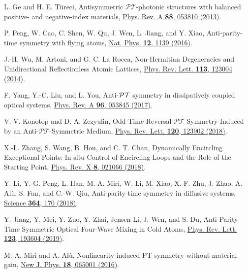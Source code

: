 \documentclass[twocolumn,prl,floatfix,citeautoscript,nofootinbib,superscriptaddress]{revtex4}
\begin{document}
\begin{thebibliography}{99}

 L. Ge and H. E. T\"ureci, Antisymmetric $%
\mathcal{PT}$-photonic structures with balanced positive- and negative-index
materials, \href{https://doi.org/10.1103/PhysRevA.88.053810}{Phys. Rev. A
\textbf{88}, 053810 (2013)}.

 P. Peng, W. Cao, C. Shen, W. Qu, J. Wen, L. Jiang, and
Y. Xiao, Anti-parity-time symmetry with flying atoms, \href{https://doi.org/10.1038/nphys3842}%
{Nat. Phys. \textbf{12}, 1139 (2016)}.

 J.-H. Wu, M. Artoni, and G. C. La Rocca,
Non-Hermitian Degeneracies and Unidirectional Reflectionless Atomic
Lattices, \href{https://doi.org/10.1103/PhysRevLett.113.123004}{Phys. Rev.
Lett. \textbf{113}, 123004 (2014)}.

 F. Yang, Y.-C. Liu, and L. You, Anti-$\mathcal{%
PT}$ symmetry in dissipatively coupled optical systems, \href{https://doi.org/10.1103/PhysRevA.96.053845}%
{Phys. Rev. A \textbf{96}, 053845 (2017)}.

 V. V. Konotop and D. A. Zezyulin, Odd-Time
Reversal $\mathcal{P}\mathcal{T}$ Symmetry Induced by an Anti-$\mathcal{P}%
\mathcal{T}$-Symmetric Medium, \href{https://doi.org/10.1103/PhysRevLett.120.123902}%
{Phys. Rev. Lett. \textbf{120}, 123902 (2018)}.

 X.-L. Zhang, S. Wang, B. Hou, and C. T. Chan,
Dynamically Encircling Exceptional Points: In situ Control of Encircling
Loops and the Role of the Starting Point, \href{https://doi.org/10.1103/PhysRevX.8.021066}%
{Phys. Rev. X \textbf{8}, 021066 (2018)}.

 Y. Li, Y.-G. Peng, L. Han, M.-A. Miri, W. Li, M.
Xiao, X.-F. Zhu, J. Zhao, A. Al\`u, S. Fan, and C.-W. Qiu, Anti-parity-time
symmetry in diffusive systems, \href{https://doi.org/10.1126/science.aaw6259}%
{Science \textbf{364}, 170 (2018)}.

 Y. Jiang, Y. Mei, Y. Zuo, Y. Zhai, Jensen
Li, J. Wen, and S. Du, Anti-Parity-Time Symmetric Optical Four-Wave Mixing
in Cold Atoms, \href{https://doi.org/10.1103/PhysRevLett.123.193604}{Phys.
Rev. Lett. \textbf{123}, 193604 (2019)}.


 M.-A. Miri and A. Al\`u, Nonlinearity-induced PT-symmetry
without material gain, \href{http://dx.doi.org/10.1088/1367-2630/18/6/065001}%
{New J. Phys. \textbf{18}, 065001 (2016)}.


\end{thebibliography}
\end{document}
